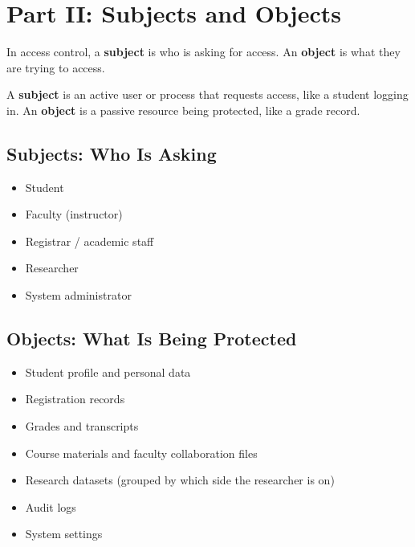     \pagebreak

    \section{Part II: Subjects and Objects}

        In access control, a \textbf{subject} is who is asking for access. An \textbf{object} is what they are
        trying to access.

        \begin{defbox}
            A \textbf{subject} is an active user or process that requests access, like a student logging in.
            An \textbf{object} is a passive resource being protected, like a grade record.
        \end{defbox}

        \subsection[Subjects]{Subjects: Who Is Asking}

            \begin{itemize}
                \item Student
                \item Faculty (instructor)
                \item Registrar / academic staff
                \item Researcher
                \item System administrator
            \end{itemize}

        \subsection[Objects]{Objects: What Is Being Protected}

            \begin{itemize}
                \item Student profile and personal data
                \item Registration records
                \item Grades and transcripts
                \item Course materials and faculty collaboration files
                \item Research datasets (grouped by which side the researcher is on)
                \item Audit logs
                \item System settings
            \end{itemize}

